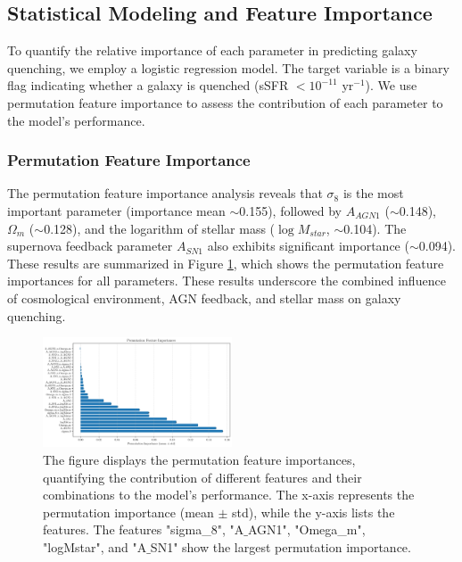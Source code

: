 \documentclass[twocolumn]{aastex631}
\begin{document}
\subsection{Statistical Modeling and Feature Importance}

To quantify the relative importance of each parameter in predicting galaxy quenching, we employ a logistic regression model. The target variable is a binary flag indicating whether a galaxy is quenched (sSFR \(< 10^{-11} \text{ yr}^{-1}\)). We use permutation feature importance to assess the contribution of each parameter to the model's performance.

\subsubsection{Permutation Feature Importance}

The permutation feature importance analysis reveals that \(\sigma_8\) is the most important parameter (importance mean \(\sim\)0.155), followed by \(A_{AGN1}\) (\(\sim\)0.148), \(\Omega_m\) (\(\sim\)0.128), and the logarithm of stellar mass (\(\log M_{star}\), \(\sim\)0.104). The supernova feedback parameter \(A_{SN1}\) also exhibits significant importance (\(\sim\)0.094). These results are summarized in Figure \ref{fig:permutation_importance}, which shows the permutation feature importances for all parameters. These results underscore the combined influence of cosmological environment, AGN feedback, and stellar mass on galaxy quenching.

\begin{figure}[h!]
    \centering
    \includegraphics[width=0.5\textwidth]{../Project6/plots/permutation_importance_20250424_133935.png}
    \caption{\label{fig:permutation_importance} The figure displays the permutation feature importances, quantifying the contribution of different features and their combinations to the model's performance. The x-axis represents the permutation importance (mean $\pm$ std), while the y-axis lists the features. The features "sigma\_8", "A\ensuremath{\_}AGN1", "Omega\_m", "logMstar", and "A\ensuremath{\_}SN1" show the largest permutation importance.
}
\end{figure}
\end{document}
